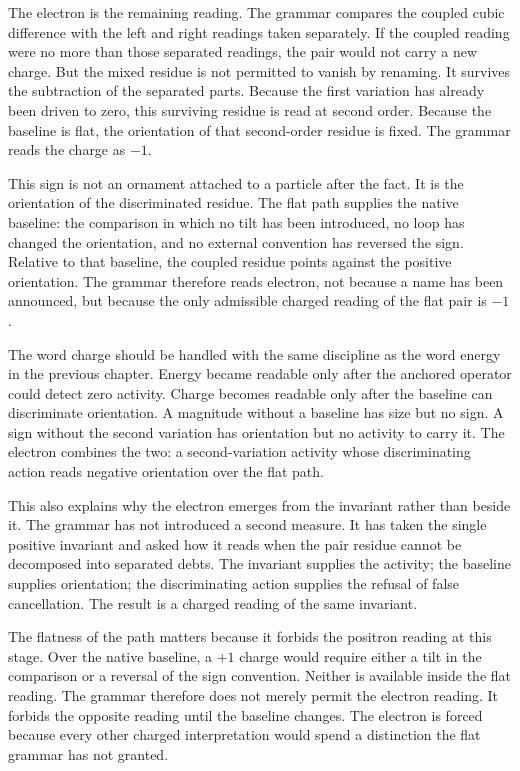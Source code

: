The electron is the remaining reading. The grammar compares the coupled
cubic difference with the left and right readings taken separately. If the
coupled reading were no more than those separated readings, the pair would
not carry a new charge. But the mixed residue is not permitted to vanish by
renaming. It survives the subtraction of the separated parts. Because the
first variation has already been driven to zero, this surviving residue is
read at second order. Because the baseline is flat, the orientation of that
second-order residue is fixed. The grammar reads the charge as \(-1\).

This sign is not an ornament attached to a particle after the fact. It is the
orientation of the discriminated residue. The flat path supplies the native
baseline: the comparison in which no tilt has been introduced, no loop has
changed the orientation, and no external convention has reversed the sign.
Relative to that baseline, the coupled residue points against the positive
orientation. The grammar therefore reads electron, not because a name has
been announced, but because the only admissible charged reading of the flat
pair is \(-1\).

The word charge should be handled with the same discipline as the word
energy in the previous chapter. Energy became readable only after the
anchored operator could detect zero activity. Charge becomes readable only
after the baseline can discriminate orientation. A magnitude without a
baseline has size but no sign. A sign without the second variation has
orientation but no activity to carry it. The electron combines the two: a
second-variation activity whose discriminating action reads negative
orientation over the flat path.

This also explains why the electron emerges from the invariant rather than
beside it. The grammar has not introduced a second measure. It has taken the
single positive invariant and asked how it reads when the pair residue cannot
be decomposed into separated debts. The invariant supplies the activity; the
baseline supplies orientation; the discriminating action supplies the refusal
of false cancellation. The result is a charged reading of the same invariant.

The flatness of the path matters because it forbids the positron reading at
this stage. Over the native baseline, a \(+1\) charge would require either a
tilt in the comparison or a reversal of the sign convention. Neither is
available inside the flat reading. The grammar therefore does not merely
permit the electron reading. It forbids the opposite reading until the
baseline changes. The electron is forced because every other charged
interpretation would spend a distinction the flat grammar has not granted.

